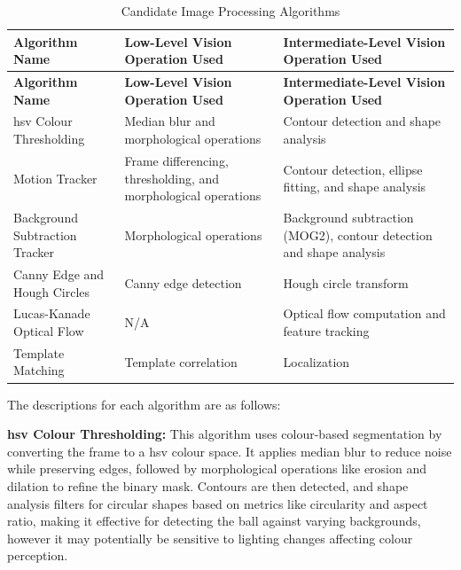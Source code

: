\documentclass[12pt,a4paper]{article}
\begin{document}
\begin{longtable}{@{} p{} p{} p{} @{}}
\caption{Candidate Image Processing Algorithms}
\label{tab:candidate_algorithms} \\
    \toprule
    \textbf{Algorithm Name} & \textbf{Low-Level Vision Operation Used} & \textbf{Intermediate-Level Vision Operation Used} \\
    \midrule
    \endfirsthead
    \toprule
    \textbf{Algorithm Name} & \textbf{Low-Level Vision Operation Used} & \textbf{Intermediate-Level Vision Operation Used} \\
    \midrule
    \endhead
    \bottomrule
    \endfoot
    \bottomrule
    \endlastfoot
    \acs{hsv} Colour Thresholding & Median blur and morphological operations & Contour detection and shape analysis \\
    
    Motion Tracker & Frame differencing, thresholding, and morphological operations & Contour detection, ellipse fitting, and shape analysis \\
    
    Background Subtraction Tracker & Morphological operations & Background subtraction (MOG2), contour detection and shape analysis \\
    
    Canny Edge and Hough Circles & Canny edge detection & Hough circle transform \\
    
    Lucas-Kanade Optical Flow & N/A & Optical flow computation and feature tracking \\
    
    Template Matching & Template correlation & Localization \\
\end{longtable}

The descriptions for each algorithm are as follows:

    \textbf{\acs{hsv} Colour Thresholding:} This algorithm uses colour-based segmentation by converting the frame to a \acs{hsv} colour space. It applies median blur to reduce noise while preserving edges, followed by morphological operations like erosion and dilation to refine the binary mask. Contours are then detected, and shape analysis filters for circular shapes based on metrics like circularity and aspect ratio, making it effective for detecting the ball against varying backgrounds, however it may potentially be sensitive to lighting changes affecting colour perception.
    
\end{document}
